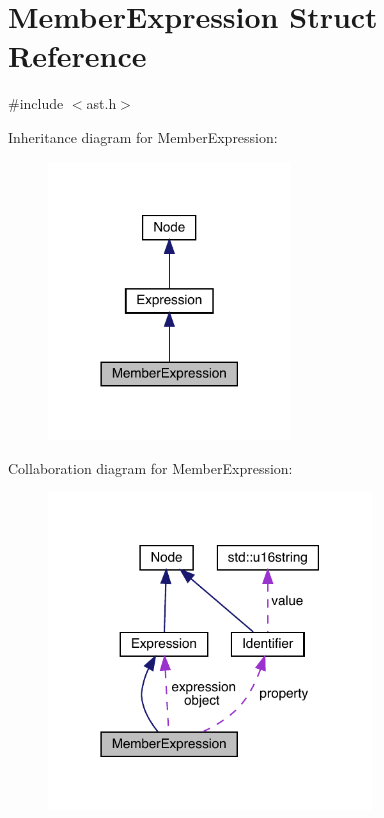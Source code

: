 \hypertarget{struct_member_expression}{}\section{Member\+Expression Struct Reference}
\label{struct_member_expression}


{\ttfamily \#include $<$ast.\+h$>$}



Inheritance diagram for Member\+Expression\+:\nopagebreak
\begin{figure}[H]
\begin{center}
\leavevmode
\includegraphics[width=182pt]{struct_member_expression__inherit__graph}
\end{center}
\end{figure}


Collaboration diagram for Member\+Expression\+:
\nopagebreak
\begin{figure}[H]
\begin{center}
\leavevmode
\includegraphics[width=243pt]{struct_member_expression__coll__graph}
\end{center}
\end{figure}
